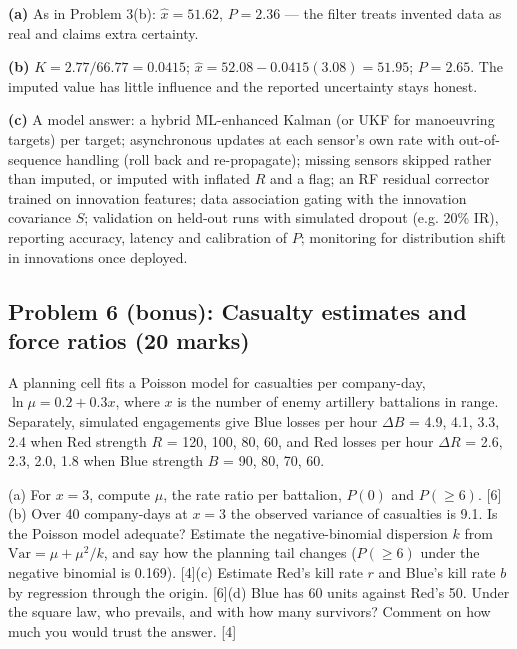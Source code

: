 \documentclass[11pt]{article}
\begin{document}
\begin{soln}\textbf{(a)} As in Problem 3(b): $\hat x=51.62$, $P=2.36$ --- the filter treats invented data as real and claims extra certainty.

\textbf{(b)} $K=2.77/66.77=0.0415$; $\hat x=52.08-0.0415(3.08)=51.95$; $P=2.65$. The imputed value has little influence and the reported uncertainty stays honest.

\textbf{(c)} A model answer: a hybrid ML-enhanced Kalman (or UKF for manoeuvring targets) per target; asynchronous updates at each sensor's own rate with out-of-sequence handling (roll back and re-propagate); missing sensors skipped rather than imputed, or imputed with inflated $R$ and a flag; an RF residual corrector trained on innovation features; data association gating with the innovation covariance $S$; validation on held-out runs with simulated dropout (e.g. 20\% IR), reporting accuracy, latency and calibration of $P$; monitoring for distribution shift in innovations once deployed.\end{soln}

\subsection{Problem 6 (bonus): Casualty estimates and force ratios \normalfont\small\color{GreyN}(20 marks)}

\begin{prob}A planning cell fits a Poisson model for casualties per company-day, $\ln\mu=0.2+0.3x$, where $x$ is the number of enemy artillery battalions in range. Separately, simulated engagements give Blue losses per hour $\Delta B$ = 4.9, 4.1, 3.3, 2.4 when Red strength $R$ = 120, 100, 80, 60, and Red losses per hour $\Delta R$ = 2.6, 2.3, 2.0, 1.8 when Blue strength $B$ = 90, 80, 70, 60.

(a) For $x=3$, compute $\mu$, the rate ratio per battalion, $P(0)$ and $P(\ge6)$. [6]\newline (b) Over 40 company-days at $x=3$ the observed variance of casualties is 9.1. Is the Poisson model adequate? Estimate the negative-binomial dispersion $k$ from $\text{Var}=\mu+\mu^2/k$, and say how the planning tail changes ($P(\ge6)$ under the negative binomial is 0.169). [4]\newline (c) Estimate Red's kill rate $r$ and Blue's kill rate $b$ by regression through the origin. [6]\newline (d) Blue has 60 units against Red's 50. Under the square law, who prevails, and with how many survivors? Comment on how much you would trust the answer. [4]\end{prob}
\end{document}
